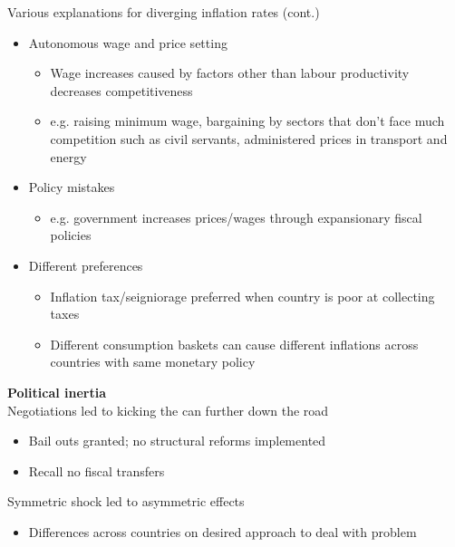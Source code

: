 \documentclass{beamer}
\begin{document}
\begin{frame}
  Various explanations for diverging inflation rates (cont.)
\begin{itemize}  
  \item Autonomous wage and price setting
  \begin{itemize}
    \item Wage increases caused by factors other than labour productivity decreases competitiveness
    \item e.g. raising minimum wage, bargaining by sectors that don't face much competition such as civil servants, administered prices in transport and energy
  \end{itemize}
  \item Policy mistakes
  \begin{itemize}
    \item e.g. government increases prices/wages through expansionary fiscal policies
  \end{itemize}  
  \item Different preferences
  \begin{itemize}
    \item Inflation tax/seigniorage preferred when country is poor at collecting taxes
    \item Different consumption baskets can cause different inflations across countries with same monetary policy
  \end{itemize}
\end{itemize}
\end{frame}

\begin{frame}
  \textbf{Political inertia}\\
  Negotiations led to kicking the can further down the road
  \begin{itemize}
    \item Bail outs granted; no structural reforms implemented
    \item Recall no fiscal transfers
  \end{itemize}
  \medskip
  Symmetric shock led to asymmetric effects
  \begin{itemize}
    \item Differences across countries on desired approach to deal with problem
  \end{itemize}
\end{frame}
\end{document}
